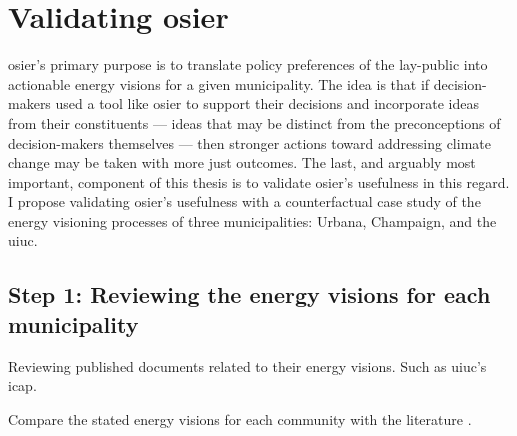 \section{Validating \ac{osier}}

\ac{osier}'s primary purpose is to translate policy preferences of the lay-public into
actionable energy visions for a given municipality. The idea is that if decision-makers 
used a tool like \ac{osier} to support their decisions and incorporate ideas from their 
constituents --- ideas that may be distinct from the preconceptions of decision-makers
themselves --- then stronger actions toward addressing climate change may be taken with 
more just outcomes. The last, and arguably most important, component of this thesis is 
to validate \ac{osier}'s usefulness in this regard. I propose validating \ac{osier}'s 
usefulness with a counterfactual case study of the energy visioning processes of three 
municipalities: Urbana, Champaign, and the \ac{uiuc}.

\subsection{Step 1: Reviewing the energy visions for each municipality}

Reviewing published documents related to their energy visions. Such as \ac{uiuc}'s \ac{icap}.

Compare the stated energy visions for each community with the literature \cite{elmallah_frontlining_2022}.



